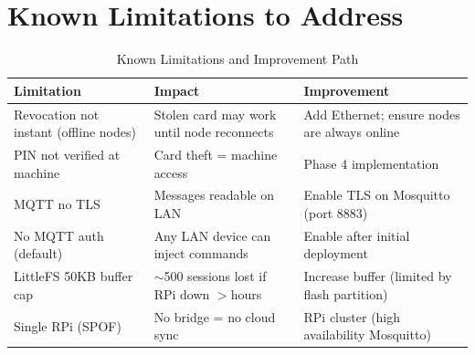\section{Known Limitations to Address}

\begin{table}[H]
\centering
\caption{Known Limitations and Improvement Path}
\begin{tabular}{L{5cm}L{5cm}L{4.5cm}}
\toprule
\textbf{Limitation} & \textbf{Impact} & \textbf{Improvement} \\
\midrule
Revocation not instant (offline nodes) & Stolen card may work until node reconnects & Add Ethernet; ensure nodes are always online \\
PIN not verified at machine & Card theft = machine access & Phase 4 implementation \\
MQTT no TLS & Messages readable on LAN & Enable TLS on Mosquitto (port 8883) \\
No MQTT auth (default) & Any LAN device can inject commands & Enable after initial deployment \\
LittleFS 50KB buffer cap & $\sim$500 sessions lost if RPi down $>$hours & Increase buffer (limited by flash partition) \\
Single RPi (SPOF) & No bridge = no cloud sync & RPi cluster (high availability Mosquitto) \\
\bottomrule
\end{tabular}
\end{table}
